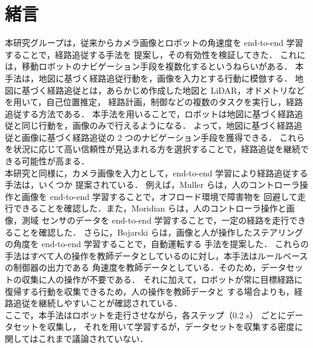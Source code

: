 \documentclass{jarticle}
\begin{document}
\date{} %

\maketitle
\thispagestyle{empty}
\pagestyle{empty}

\small
\section{緒言}
本研究グループは，従来からカメラ画像とロボットの角速度を end-to-end 学習することで，経路追従する手法を
提案し，その有効性を検証してきた\cite{okada}\cite{okada2}\cite{kiyooka}．
これには，移動ロボットのナビゲーション手段を複数化するというねらいがある．
本手法は，地図に基づく経路追従行動を，画像を入力とする行動に模倣する．
地図に基づく経路追従とは，あらかじめ作成した地図と LiDAR，オドメトリなどを用いて，自己位置推定，
経路計画，制御などの複数のタスクを実行し，経路追従する方法である．
本手法を用いることで，ロボットは地図に基づく経路追従と同じ行動を，画像のみで行えるようになる．
よって，地図に基づく経路追従と画像に基づく経路追従の 2 つのナビゲーション手段を獲得できる．
これらを状況に応じて高い信頼性が見込まれる方を選択することで，経路追従を継続できる可能性が高まる．\\
\hspace*{1zw}本研究と同様に，カメラ画像を入力として，end-to-end 学習により経路追従する手法は，いくつか
提案されている．
例えば，Muller らは，人のコントローラ操作と画像を end-to-end 学習することで，オフロード環境で障害物を
回避して走行できることを確認した\cite{off_load}．また，Moridian らは，人のコントローラ操作と画像，測域
センサのデータを end-to-end 学習することで，一定の経路を走行できることを確認した\cite{Moridian}．
さらに，Bojarski らは，画像と人が操作したステアリングの角度を end-to-end 学習することで，自動運転する
手法を提案した\cite{Bojarski}．
これらの手法はすべて人の操作を教師データとしているのに対し，本手法はルールベースの制御器の出力である
角速度を教師データとしている．そのため，データセットの収集に人の操作が不要である．
それに加えて，ロボットが常に目標経路に復帰する行動を収集できるため，人の操作を教師データと
する場合よりも，経路追従を継続しやすいことが確認されている\cite{imai}．\\
\hspace*{1zw}ここで，本手法はロボットを走行させながら，各ステップ（0.2 s） ごとにデータセットを収集し，
それを用いて学習するが，データセットを収集する密度に関してはこれまで議論されていない．
\end{document}
